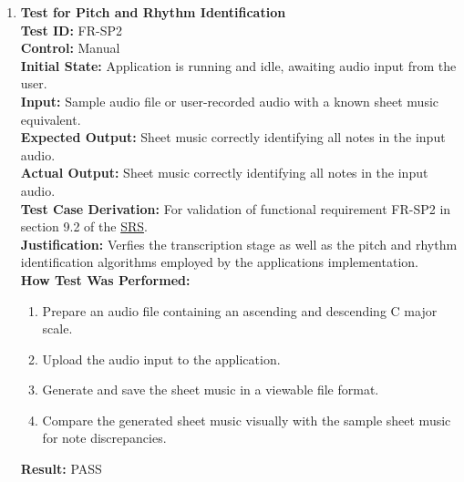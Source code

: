 \documentclass[12pt, titlepage]{article}
\begin{document}
\begin{enumerate}
    \item \textbf{Test for Pitch and Rhythm Identification} \\
      \newline
      \textbf{Test ID:} FR-SP2 \\
      \textbf{Control:} Manual \\
      \textbf{Initial State:} Application is running and idle, awaiting audio input from the user. \\
      \textbf{Input:} Sample audio file or user-recorded audio with a known sheet music equivalent. \\
      \textbf{Expected Output:} Sheet music correctly identifying all notes in the input audio. \\
      \textbf{Actual Output:} Sheet music correctly identifying all notes in the input audio. \\
      \textbf{Test Case Derivation:} For validation of functional requirement FR-SP2 in section 9.2 of the 
      \href{https://github.com/emilyperica/ScoreGen/blob/main/docs/SRS-Volere/SRS.pdf}{SRS}. \\
      \textbf{Justification:} Verfies the transcription stage as well as the pitch and rhythm identification algorithms employed
      by the applications implementation.\\
      \textbf{How Test Was Performed:}
      \begin{enumerate}
          \item Prepare an audio file containing an ascending and descending C major scale.
          \item Upload the audio input to the application.
          \item Generate and save the sheet music in a viewable file format.
          \item Compare the generated sheet music visually with the sample sheet music for note discrepancies.
      \end{enumerate}
      \textbf{Result:} PASS


\end{enumerate}
\end{document}

